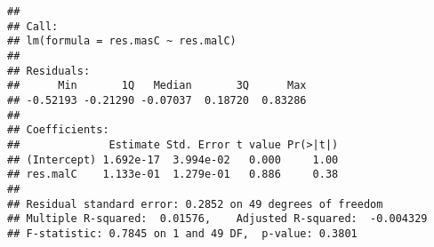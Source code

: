 \documentclass[]{article}
\newenvironment{Shaded}{\begin{snugshade}}{\end{snugshade}}
\newcommand{\KeywordTok}[1]{\textcolor[rgb]{0.13,0.29,0.53}{\textbf{#1}}}
\newcommand{\DataTypeTok}[1]{\textcolor[rgb]{0.13,0.29,0.53}{#1}}
\newcommand{\DecValTok}[1]{\textcolor[rgb]{0.00,0.00,0.81}{#1}}
\newcommand{\StringTok}[1]{\textcolor[rgb]{0.31,0.60,0.02}{#1}}
\newcommand{\OperatorTok}[1]{\textcolor[rgb]{0.81,0.36,0.00}{\textbf{#1}}}
\newcommand{\NormalTok}[1]{#1}
\begin{document}
\begin{Shaded}
\end{Shaded}

\begin{verbatim}
## 
## Call:
## lm(formula = res.masC ~ res.malC)
## 
## Residuals:
##      Min       1Q   Median       3Q      Max 
## -0.52193 -0.21290 -0.07037  0.18720  0.83286 
## 
## Coefficients:
##              Estimate Std. Error t value Pr(>|t|)
## (Intercept) 1.692e-17  3.994e-02   0.000     1.00
## res.malC    1.133e-01  1.279e-01   0.886     0.38
## 
## Residual standard error: 0.2852 on 49 degrees of freedom
## Multiple R-squared:  0.01576,    Adjusted R-squared:  -0.004329 
## F-statistic: 0.7845 on 1 and 49 DF,  p-value: 0.3801
\end{verbatim}
\end{document}
